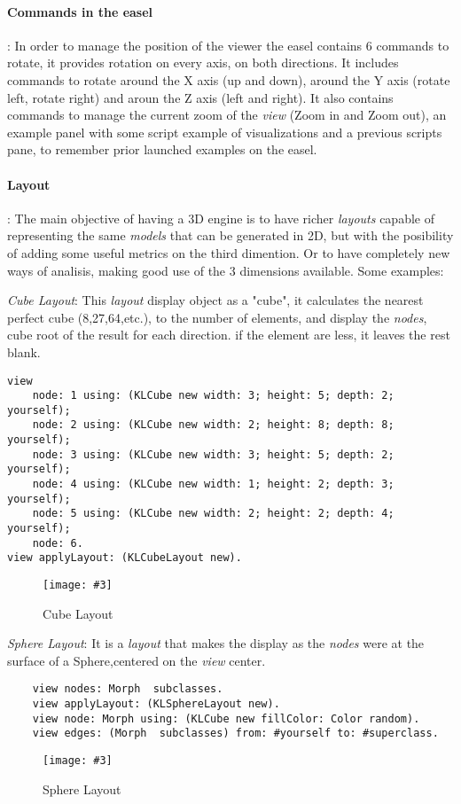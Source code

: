 \documentclass[runningheads]{llncs}
\newcommand{\fig}[4]{
	\begin{figure}[#1]
		\centering
		\texttt{[image: \#3]}
		\caption{\label{fig:#3}#4}
	\end{figure}}
\begin{document}
\paragraph{Commands in the easel}: 
In order to manage the position of the viewer the easel 
contains 6 commands to rotate, it provides rotation on 
every axis, on both directions. It includes commands
to rotate around the X axis (up and down), around the
Y axis (rotate left, rotate right) and aroun the Z axis
(left and right). It also contains commands to manage
the current zoom of the \emph{view} (Zoom in and Zoom out),
an example panel with some script example of visualizations
and a previous scripts pane, to remember prior launched examples
on the easel. %
   

\paragraph{Layout}: %
The main objective of having a 3D engine is to have richer 
\emph{layouts} capable of representing the same \emph{models} 
that can be generated in 2D, but with the posibility of adding 
some useful metrics on the third dimention. Or to have 
completely new ways of analisis, making good use of the 3 
dimensions available.
Some examples:

\emph{Cube Layout}: This \emph{layout} display object as a "cube",
it calculates the nearest perfect cube (8,27,64,etc.), to the
number of elements, and display the \emph{nodes}, cube root 
of the result for each direction. if the element are less,
it leaves the rest blank.
\begin{lstlisting}
view 
	node: 1 using: (KLCube new width: 3; height: 5; depth: 2; yourself);
	node: 2 using: (KLCube new width: 2; height: 8; depth: 8; yourself);
	node: 3 using: (KLCube new width: 3; height: 5; depth: 2; yourself);
	node: 4 using: (KLCube new width: 1; height: 2; depth: 3; yourself);
	node: 5 using: (KLCube new width: 2; height: 2; depth: 4; yourself);
	node: 6.
view applyLayout: (KLCubeLayout new). 
\end{lstlisting}
\fig{}{0.3}{figure7.png}{Cube Layout}

\emph{Sphere Layout}: It is a \emph{layout} that makes the display
as the \emph{nodes} were at the surface of a Sphere,centered on the
\emph{view} center. 
\begin{lstlisting}
	view nodes: Morph  subclasses.
	view applyLayout: (KLSphereLayout new).
	view node: Morph using: (KLCube new fillColor: Color random).
	view edges: (Morph  subclasses) from: #yourself to: #superclass.
\end{lstlisting}
\fig{}{0.7}{figure8.png}{Sphere Layout}
\end{document}
